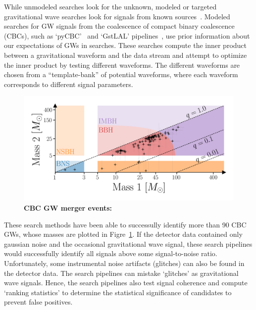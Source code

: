 While unmodeled searches look for the unknown,  modeled or targeted gravitational wave searches look for signals from known sources~\cite{abbott2016ligo}. 
Modeled searches for GW signals from the coalescence of compact binary coalescence (CBCs), such as `pyCBC'~\cite{biwer2019pycbc} and
`GstLAL' pipelines~\cite{sachdev2019gstlal},  use prior information about our expectations of GWs in searches. These searches compute the inner product between a gravitational waveform and the data stream and attempt to optimize the inner product by testing different waveforms. 
The different waveforms are chosen from a ``template-bank'' of potential waveforms, where each waveform corresponds to different signal parameters. 


\begin{figure}
\begin{center}
  \centerline{\includegraphics[width=1.1\linewidth]{src/figures/gw_catalog.png}}
  \caption{\textbf{CBC GW merger events:}  }
  \label{fig:cbc_mergers}
\end{center}
\end{figure}


These search methods have been able to successully identify more than 90 CBC GWs, whose masses are plotted in Figre~\ref{fig:cbc_mergers}.
If the detector data contained only gaussian noise and the occasional gravitational wave signal, these search pipelines would successfully identify all signals above some signal-to-noise ratio. 
Unfortunately, some instrumental noise artifacts (glitches) can also be found in the detector data. 
The search pipelines can mistake `glitches' as gravitational wave signals. 
Hence, the search pipelines also test signal coherence and compute `ranking statistics' to determine the statistical significance of candidates to prevent false positives. 

